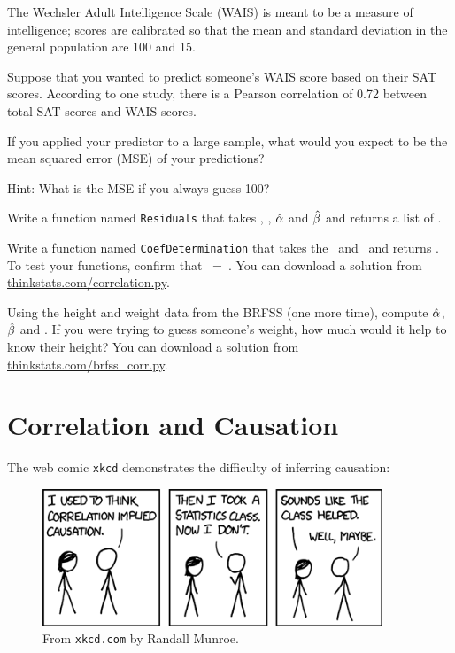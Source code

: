\documentclass[12pt]{book}
\begin{document}
\begin{exercise}
The Wechsler Adult Intelligence Scale (WAIS) is meant to be a measure
of intelligence; scores are calibrated so that the mean and standard
deviation in the general population are 100 and 15.

Suppose that you wanted to predict someone's WAIS score based on their
SAT scores.  According to one study, there is a Pearson correlation of
0.72 between total SAT scores and WAIS scores.

If you applied your predictor to a large sample, what would you expect to
be the mean squared error (MSE) of your predictions?

Hint: What is the MSE if you always guess 100?
\end{exercise}


\begin{exercise}
Write a function named {\tt Residuals} that takes \X, \Y, $\hat{\alpha}$
and $\hat{\beta}$ and returns a list of \myeps{}.

Write a function named {\tt CoefDetermination} that takes the 
\myeps{}~and \Y~and returns \R{}.  To test your functions, 
confirm that {\R{}~=~\myrho{}}.  You can download a solution
from \url{thinkstats.com/correlation.py}.

\end{exercise}

\begin{exercise}
Using the height and weight data from the BRFSS (one more time),
compute $\hat{\alpha}$, $\hat{\beta}$ and \R{}.  If you were trying to guess
someone's weight, how much would it help to know their height?
You can download a solution from
\url{thinkstats.com/brfss_corr.py}.

\end{exercise}


\section{Correlation and Causation}

The web comic {\tt xkcd} demonstrates the difficulty of inferring
causation:

\begin{figure}
\centerline{\includegraphics[width=4.0in]{figs/correlation.png}}
\caption{From {\tt xkcd.com} by Randall Munroe.}
\end{figure}
\end{document}

